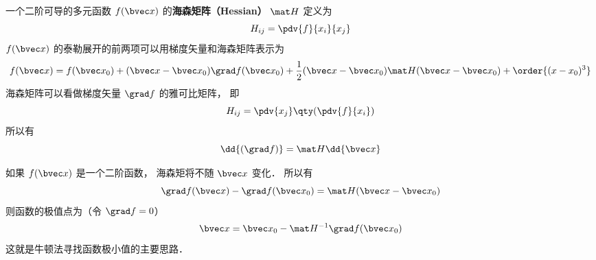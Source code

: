 
一个二阶可导的多元函数 $f(\bvec x)$ 的\textbf{海森矩阵（Hessian）} $\mat H$ 定义为
\begin{equation}
H_{ij} = \pdv{f}{x_i}{x_j}
\end{equation}
$f(\bvec x)$ 的泰勒展开的前两项可以用梯度矢量和海森矩阵表示为
\begin{equation}
f(\bvec x) = f(\bvec x_0) + (\bvec x - \bvec x_0) \grad f(\bvec x_0) + \frac12(\bvec x - \bvec x_0) \mat H (\bvec x - \bvec x_0) + \order{(x-x_0)^3}
\end{equation}
海森矩阵可以看做梯度矢量 $\grad f$ 的雅可比矩阵， 即
\begin{equation}
H_{ij} = \pdv{x_j} \qty(\pdv{f}{x_i})
\end{equation}
所以有
\begin{equation}
\dd{(\grad f)} = \mat H \dd{\bvec x}
\end{equation}

如果 $f(\bvec x)$ 是一个二阶函数， 海森矩将不随 $\bvec x$ 变化． 所以有
\begin{equation}
\grad f(\bvec x) - \grad f(\bvec x_0) = \mat H (\bvec x - \bvec x_0)
\end{equation}
则函数的极值点为（令 $\grad f = 0$）
\begin{equation}
\bvec x = \bvec x_0 - \mat H^{-1} \grad f(\bvec x_0)
\end{equation}
这就是牛顿法寻找函数极小值的主要思路．
